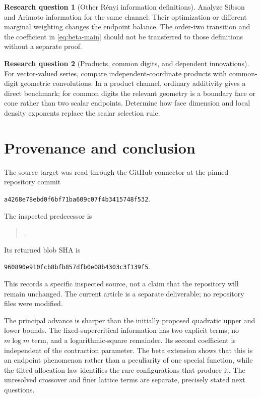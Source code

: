 \documentclass[11pt,a4paper]{article}
\numberwithin{equation}{section}
\theoremstyle{definition}\newaliascnt{definition}{theorem}
\newtheorem{problem}[problem]{Research question}
\theoremstyle{remark}\newaliascnt{remark}{theorem}
\begin{document}
\begin{problem}[Other R\'enyi information definitions]
Analyze Sibson and Arimoto information for the same channel. Their
optimization or different marginal weighting changes the endpoint balance.
The order-two transition and the coefficient in \eqref{eq:beta-main}
should not be transferred to those definitions without a separate proof.
\end{problem}

\begin{problem}[Products, common digits, and dependent innovations]
For vector-valued series, compare independent-coordinate products with
common-digit geometric convolutions. In a product channel, ordinary
additivity gives a direct benchmark; for common digits the relevant
geometry is a boundary face or cone rather than two scalar endpoints.
Determine how face dimension and local density exponents replace the
scalar selection rule.
\end{problem}

\section{Provenance and conclusion}
\label{sec:provenance}
The source target was read through the GitHub connector at the pinned
repository commit
\begin{center}\small
\texttt{a4268e78ebd0f6bf71ba609c07f4b3415748f532}.
\end{center}
The inspected predecessor is
\begin{quote}\small{}\allowbreak
{}\allowbreak
{}\allowbreak
{}.
\end{quote}
Its returned blob SHA is
\begin{center}\small
\texttt{960890e910fcb8bfb857dfb0e08b4303c3f139f5}.
\end{center}
This records a specific inspected source, not a claim that the repository
will remain unchanged. The current article is a separate deliverable; no
repository files were modified.

The principal advance is sharper than the initially proposed quadratic
upper and lower bounds. The fixed-supercritical information has two explicit
terms, no $m\log m$ term, and a logarithmic-square remainder. Its second
coefficient is independent of the contraction parameter. The beta extension
shows that this is an endpoint phenomenon rather than a peculiarity of one
special function, while the tilted allocation law identifies the rare
configurations that produce it. The unresolved crossover and finer lattice
terms are separate, precisely stated next questions.
\end{document}
